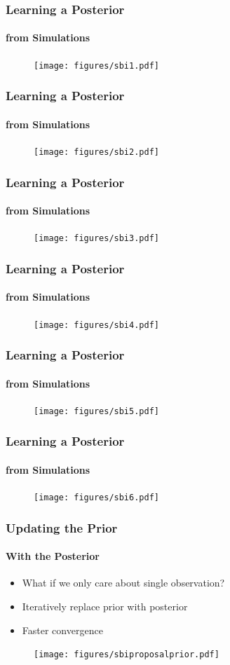 \documentclass[9pt, aspectratio=169]{beamer}
\begin{document}
\begin{frame}
\frametitle{Learning a Posterior}
\framesubtitle{from Simulations}
\begin{figure}
	\texttt{[image: figures/sbi1.pdf]}
\end{figure}
\end{frame} 
\begin{frame}
\frametitle{Learning a Posterior}
\framesubtitle{from Simulations}
\begin{figure}
	\texttt{[image: figures/sbi2.pdf]}
\end{figure}
\end{frame} \begin{frame}
\frametitle{Learning a Posterior}
\framesubtitle{from Simulations}
\begin{figure}
\texttt{[image: figures/sbi3.pdf]}
\end{figure}
\end{frame} \begin{frame}
\frametitle{Learning a Posterior}
\framesubtitle{from Simulations}
\begin{figure}
\texttt{[image: figures/sbi4.pdf]}
\end{figure}
\end{frame} \begin{frame}
\frametitle{Learning a Posterior}
\framesubtitle{from Simulations}
\begin{figure}
\texttt{[image: figures/sbi5.pdf]}
\end{figure}
\end{frame} \begin{frame}
\frametitle{Learning a Posterior}
\framesubtitle{from Simulations}
\begin{figure}
\texttt{[image: figures/sbi6.pdf]}
\end{figure}
\end{frame}




\begin{frame}
\frametitle{Updating the Prior}
\framesubtitle{With the Posterior}
\begin{itemize}
	\item What if we only care about single observation?
	\item Iteratively replace prior with posterior
	\item Faster convergence
\end{itemize}
\begin{figure}
	\texttt{[image: figures/sbiproposalprior.pdf]}
\end{figure}
\end{frame} 
\end{document}
